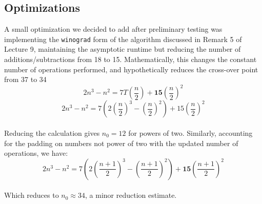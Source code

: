 \documentclass[11pt]{scrartcl}
\theoremstyle{dotlessP}
\theoremstyle{dotlessN}
\theoremstyle{dotN}
\begin{document}
\subsection{Optimizations}
A small optimization we decided to add after preliminary testing was implementing the \texttt{winograd} form of the algorithm discussed in Remark 5 of Lecture 9, maintaining the asymptotic runtime but reducing the number of additions/subtractions from 18 to 15. Mathematically, this changes the constant number of operations performed, and hypothetically reduces the cross-over point from 37 to 34\
\[2n^3 - n^2 = 7T(\frac{n}{2})+\textbf{15}(\frac{n}{2})^2\]
\[2n^3-n^2 = 7(2(\frac{n}{2})^3-(\frac{n}{2})^2)+15(\frac{n}{2})^2\]\\

Reducing the calculation gives $n_0 = 12$ for powers of two. 
Similarly, accounting for the padding on numbers not power of two with the updated number of operations, we have: 
\[2n^3 - n^2 = 7(2(\frac{n+1}{2})^3-(\frac{n+1}{2})^2)+\textbf{15}(\frac{n+1}{2})^2\]\\

Which reduces to $n_0 \approx 34$, a minor reduction estimate.\\
\end{document}
